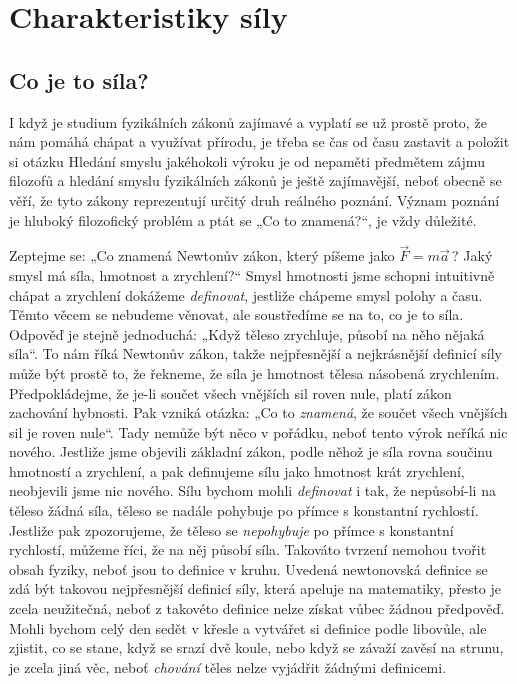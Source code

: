 {
\chapter{Charakteristiky síly}\label{fyz:IchapXII}
\minitoc
  \section{Co je to síla?}\label{fyz:IchapXIIsecI}
    I když je studium fyzikálních zákonů zajímavé a vyplatí se už prostě proto, že nám pomáhá 
    chápat a využívat přírodu, je třeba se čas od času zastavit a položit si otázku  Hledání smyslu jakéhokoli výroku je od nepaměti předmětem zájmu 
    filozofů a hledání smyslu fyzikálních zákonů je ještě zajímavější, neboť obecně se věří, že 
    tyto zákony reprezentují určitý druh reálného poznání. Význam poznání je hluboký filozofický 
    problém a ptát se „Co to znamená?“, je vždy důležité.
    
    Zeptejme se: „Co znamená Newtonův zákon, který píšeme jako \(\vec{F}=m \vec{a}\,\)? Jaký smysl 
    má síla, hmotnost a zrychlení?“ Smysl hmotnosti jsme schopni intuitivně chápat a zrychlení 
    dokážeme \emph{definovat}, jestliže chápeme smysl polohy a času. Těmto věcem se nebudeme 
    věnovat, ale soustředíme se na to, co je to síla. Odpověď je stejně jednoduchá: „Když těleso 
    zrychluje, působí na něho nějaká síla“. To nám říká Newtonův zákon, takže nejpřesnější a 
    nejkrásnější definicí síly může být prostě to, že řekneme, že síla je hmotnost tělesa násobená 
    zrychlením. Předpokládejme, že je-li součet všech vnějších sil roven nule, platí zákon 
    zachování hybnosti. Pak vzniká otázka: „Co to \emph{znamená}, že součet všech vnějších sil je 
    roven nule“. Tady nemůže být něco v pořádku, neboť tento výrok neříká nic nového. Jestliže jsme 
    objevili základní zákon, podle něhož je síla rovna součinu hmotností a zrychlení, a pak 
    definujeme sílu jako hmotnost krát zrychlení, neobjevili jsme nic nového. Sílu bychom mohli 
    \emph{definovat} i tak, že nepůsobí-li na těleso žádná síla, těleso se nadále pohybuje po 
    přímce s konstantní rychlostí. Jestliže pak zpozorujeme, že těleso se \emph{nepohybuje} po 
    přímce s konstantní rychlostí, můžeme říci, že na něj působí síla. Takováto tvrzení nemohou 
    tvořit obsah fyziky, neboť jsou to definice v kruhu. Uvedená newtonovská definice se zdá být 
    takovou nejpřesnější definicí síly, která apeluje na matematiky, přesto je zcela neužitečná, 
    neboť z takovéto definice nelze získat vůbec žádnou předpověď. Mohli bychom celý den sedět v 
    křesle a vytvářet si definice podle libovůle, ale zjistit, co se stane, když se srazí dvě 
    koule, nebo když se závaží zavěsí na strunu, je zcela jiná věc, neboť \emph{chování} těles 
    nelze vyjádřit žádnými definicemi.
    
}
